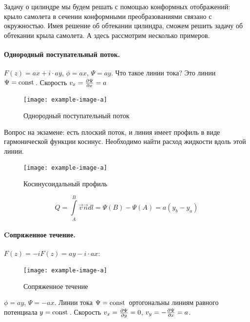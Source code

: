 Задачу о цилиндре мы будем решать с помощью конформных отображений: крыло самолета в сечении конформными преобразованиями связано с окружностью. Имея решение об обтекании цилиндра, сможем решить задачу об обтекании крыла самолета. А здесь рассмотрим несколько примеров.

\paragraph{Однородный поступательный поток.} $F(z)=ax+i\cdot ay$, $\phi=ax$, $\Psi=ay$. Что такое линии тока? Это линии $\Psi=\mathrm{const}\,$. Скорость $v_x=\pdv{\Psi}{x}=a$

\begin{figure}[h!]
    \centering
    \texttt{[image: example-image-a]}
    \caption{Однородный поступательный поток}
    \label{fig:figure1}
\end{figure}

Вопрос на экзамене: есть плоский поток, и линия имеет профиль в виде гармонической функции косинус. Необходимо найти расход жидкости вдоль этой линии.

\begin{figure}[h!]
    \centering
    \texttt{[image: example-image-a]}
    \caption{Косинусоидальный профиль}
    \label{fig:figure1}
\end{figure}

\begin{equation}
	Q=\int\limits_{A}^{B} \vec{v}\vec{n}dl=\Psi(B)-\Psi(A)=a(y_b-y_a)
\end{equation}


\paragraph{Cопряженное течение.} $F(z)=-iF(z)=ay - i\cdot ax$:

\begin{figure}[h!]
    \centering
    \texttt{[image: example-image-a]}
    \caption{Сопряженное течение}
    \label{fig:figure1}
\end{figure}
$\phi=ay$, $\Psi=-ax$. Линии тока $\Psi=\mathrm{const}\,$ ортогональны линиям равного потенциала $y=\mathrm{const}\,$. Скорость $v_x=\pdv{\Psi}{y}=0$, $v_y=-\pdv{\Psi}{x}=a$.

